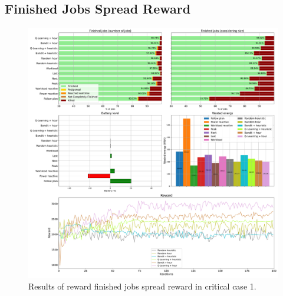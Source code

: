 \clearpage

\subsection{Finished Jobs Spread Reward}

\begin{figure}[!htb]
    \centering
    \includegraphics[scale=0.29]{Images/Learning_compensations/reward_finished_spread_profile_best_workload_1_with_noise_state_delta.pdf}
    \caption{Results of reward finished jobs spread reward in critical case 1.}
    \label{fig:spread_reward_results_critical_1}
\end{figure}

